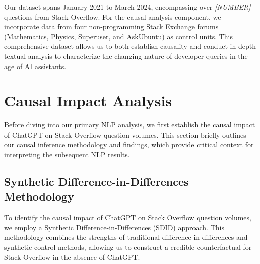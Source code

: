 Our dataset spans January 2021 to March 2024, encompassing over \textit{[NUMBER]} questions from Stack Overflow. For the causal analysis component, we incorporate data from four non-programming Stack Exchange forums (Mathematics, Physics, Superuser, and AskUbuntu) as control units. This comprehensive dataset allows us to both establish causality and conduct in-depth textual analysis to characterize the changing nature of developer queries in the age of AI assistants.

\section{Causal Impact Analysis}
Before diving into our primary NLP analysis, we first establish the causal impact of ChatGPT on Stack Overflow question volumes. This section briefly outlines our causal inference methodology and findings, which provide critical context for interpreting the subsequent NLP results.

\subsection{Synthetic Difference-in-Differences Methodology}
To identify the causal impact of ChatGPT on Stack Overflow question volumes, we employ a Synthetic Difference-in-Differences (SDID) approach. This methodology combines the strengths of traditional difference-in-differences and synthetic control methods, allowing us to construct a credible counterfactual for Stack Overflow in the absence of ChatGPT.\\

